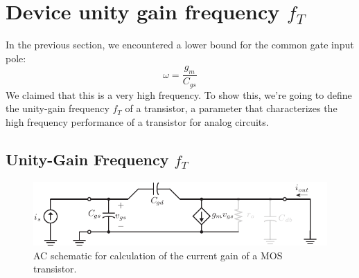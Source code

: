 \section{Device unity gain frequency $f_T$}
In the previous section, we encountered a lower bound for the common gate input pole:
\begin{equation}
	\omega = \frac{g_m}{C_{gs}}
\end{equation}
We claimed that this is a very high frequency.  To show this, we're going to define the unity-gain frequency $f_T$ of a transistor, a parameter that characterizes the high frequency performance of a transistor for analog circuits.
\subsection{Unity-Gain Frequency $f_T$}
\begin{figure}[tb]
\begin{center}
\includegraphics[scale=1]{hybrid_pi_ft}
\end{center}
\caption{AC schematic for calculation of the current gain of a MOS transistor.}
\label{fig:hybrid_pi_ft}
\end{figure}


